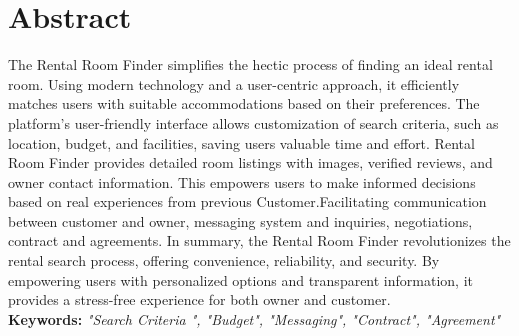 \section*{Abstract}
The Rental Room Finder  simplifies the hectic process of finding an ideal rental room. Using modern technology and a user-centric approach, it efficiently matches users with suitable accommodations based on their preferences. The platform's user-friendly interface allows customization of search criteria, such as location, budget, and facilities, saving users valuable time and effort. Rental Room Finder provides detailed room listings with images, verified reviews, and owner contact information. This empowers users to make informed decisions based on real experiences from previous Customer.Facilitating  communication between customer and owner,  messaging system and inquiries, negotiations, contract and agreements. In summary, the Rental Room Finder revolutionizes the rental search process, offering convenience, reliability, and security. By empowering users with personalized options and transparent information, it provides a stress-free experience for both owner and customer.
\\
\textbf{Keywords:} \textit{ "Search Criteria  ", "Budget", "Messaging", "Contract", "Agreement"}
\par